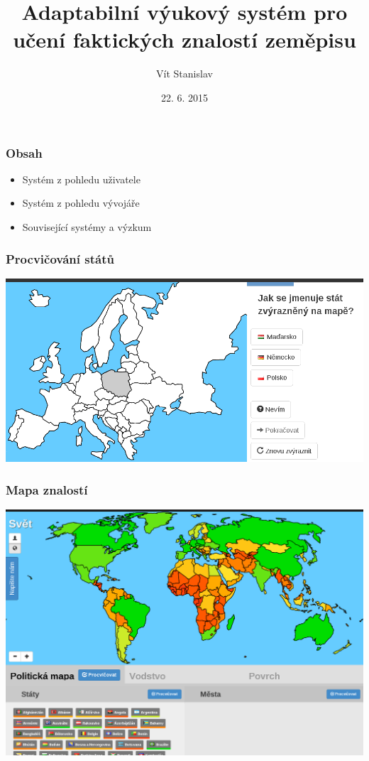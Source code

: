 \documentclass[xcolor=svgnames]{beamer}
\title[slepemapy.cz]{Adaptabilní výukový systém pro učení faktických znalostí zeměpisu}
\author{Vít Stanislav}
\institute{Fakulta informatiky Masarykovy univerzity}      %
\date{22. 6. 2015}
\begin{document}
\frame[plain]{\titlepage}
\begin{frame}
	\frametitle{Obsah}
  \begin{itemize}
  \huge \item Systém z pohledu uživatele
  \huge \item Systém z pohledu vývojáře
  \huge \item Související systémy a výzkum
  \end{itemize}
\end{frame}
\begin{frame}
	\frametitle{Procvičování států}
   \includegraphics[width=\textwidth]{img/practice-example-cs.png}
\end{frame}
\begin{frame}
	\frametitle{Mapa znalostí}
   \includegraphics[width=\textwidth]{img/knowledge-map-world.png}
\end{frame}
\end{document}
